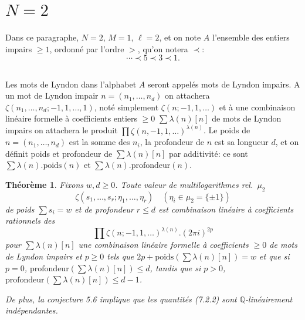 \documentclass[11pt,a4paper]{article}
\theoremstyle{plain}
\newtheorem{theorem}{Th\'eor\`eme}[section]
\theoremstyle{definition}
\newcommand{\Q}{\mathbb{Q}}
\begin{document}
\section{$N=2$}
\label{sec:7}

Dans ce paragraphe, $N=2$, $M=1$, $\ell=2$, et on note $A$ l'ensemble des entiers impairs $\geq 1$, ordonn\'e par l'ordre $>$, qu'on notera $\prec$:
\[
\cdots \prec 5 \prec 3 \prec 1.
\]

\subsection{}
Les mots de Lyndon dans l'alphabet $A$ seront appel\'es mots de Lyndon impairs. A un mot de Lyndon impair $n = (n_1,\ldots,n_d)$ on attachera $\zeta(n_1,\ldots,n_d; -1, 1,\ldots,1)$, not\'e simplement $\zeta(n; -1, 1, \ldots)$ et \`a une combinaison lin\'eaire formelle \`a coefficients entiers $\geq 0$ $\sum \lambda(n)[n]$ de mots de Lyndon impairs on attachera le produit $\prod \zeta(n, -1, 1, \ldots)^{\lambda(n)}$. Le poids de $n = (n_1,\ldots,n_d)$ est la somme des $n_i$, la profondeur de $n$ est sa longueur $d$, et on d\'efinit poids et profondeur de $\sum \lambda(n)[n]$ par additivit\'e: ce sont $\sum \lambda(n).\text{poids}(n)$ et $\sum \lambda(n).\text{profondeur}(n)$.

\begin{theorem}\label{thm:7.2}
Fixons $w, d \geq 0$. Toute valeur de multilogarithmes rel.~$\mu_2$
\begin{equation}\label{eq:7.2.1}
\zeta(s_1,\ldots,s_r; \eta_1,\ldots, \eta_r) \quad (\eta_i \in \mu_2 = \{\pm 1\})
\end{equation}
de poids $\sum s_i = w$ et de profondeur $r \leq d$ est combinaison lin\'eaire \`a coefficients rationnels des
\begin{equation}\label{eq:7.2.2}
\prod \zeta(n; -1, 1, \ldots)^{\lambda(n)}.(2\pi i)^{2p}
\end{equation}
pour $\sum \lambda(n)[n]$ une combinaison lin\'eaire formelle \`a coefficients $\geq 0$ de mots de Lyndon impairs et $p \geq 0$ tels que $2p + \text{poids}(\sum \lambda(n)[n]) = w$ et que si $p=0$, $\text{profondeur}(\sum \lambda(n)[n]) \leq d$, tandis que si $p > 0$, $\text{profondeur}(\sum \lambda(n)[n]) \leq d-1$.

De plus, la conjecture 5.6 implique que les quantit\'es (7.2.2) sont $\Q$-lin\'eairement ind\'ependantes.
\end{theorem}
\end{document}
